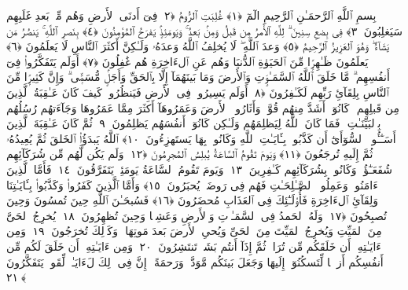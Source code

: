 
  
    
  
    
    

\nopagebreak
  بِسمِ ٱللَّهِ ٱلرَّحمَـٰنِ ٱلرَّحِيمِ
  الٓمٓ ﴿١﴾
 غُلِبَتِ ٱلرُّومُ ﴿٢﴾
 فِىٓ أَدنَى ٱلأَرضِ وَهُم مِّنۢ بَعدِ غَلَبِهِم سَيَغلِبُونَ ﴿٣﴾
 فِى بِضعِ سِنِينَ ۗ لِلَّهِ ٱلأَمرُ مِن قَبلُ وَمِنۢ بَعدُ ۚ وَيَومَئِذٍۢ يَفرَحُ ٱلمُؤمِنُونَ ﴿٤﴾
 بِنَصرِ ٱللَّهِ ۚ يَنصُرُ مَن يَشَآءُ ۖ وَهُوَ ٱلعَزِيزُ ٱلرَّحِيمُ ﴿٥﴾
 وَعدَ ٱللَّهِ ۖ لَا يُخلِفُ ٱللَّهُ وَعدَهُۥ وَلَـٰكِنَّ أَكثَرَ ٱلنَّاسِ لَا يَعلَمُونَ ﴿٦﴾
 يَعلَمُونَ ظَـٰهِرًۭا مِّنَ ٱلحَيَوٰةِ ٱلدُّنيَا وَهُم عَنِ ٱلءَاخِرَةِ هُم غَٰفِلُونَ ﴿٧﴾
 أَوَلَم يَتَفَكَّرُوا۟ فِىٓ أَنفُسِهِم ۗ مَّا خَلَقَ ٱللَّهُ ٱلسَّمَـٰوَٟتِ وَٱلأَرضَ وَمَا بَينَهُمَآ إِلَّا بِٱلحَقِّ وَأَجَلٍۢ مُّسَمًّۭى ۗ وَإِنَّ كَثِيرًۭا مِّنَ ٱلنَّاسِ بِلِقَآئِ رَبِّهِم لَكَـٰفِرُونَ ﴿٨﴾
 أَوَلَم يَسِيرُوا۟ فِى ٱلأَرضِ فَيَنظُرُوا۟ كَيفَ كَانَ عَـٰقِبَةُ ٱلَّذِينَ مِن قَبلِهِم ۚ كَانُوٓا۟ أَشَدَّ مِنهُم قُوَّةًۭ وَأَثَارُوا۟ ٱلأَرضَ وَعَمَرُوهَآ أَكثَرَ مِمَّا عَمَرُوهَا وَجَآءَتهُم رُسُلُهُم بِٱلبَيِّنَـٰتِ ۖ فَمَا كَانَ ٱللَّهُ لِيَظلِمَهُم وَلَـٰكِن كَانُوٓا۟ أَنفُسَهُم يَظلِمُونَ ﴿٩﴾
 ثُمَّ كَانَ عَـٰقِبَةَ ٱلَّذِينَ أَسَـٰٓـُٔوا۟ ٱلسُّوٓأَىٰٓ أَن كَذَّبُوا۟ بِـَٔايَـٰتِ ٱللَّهِ وَكَانُوا۟ بِهَا يَستَهزِءُونَ ﴿١٠﴾
 ٱللَّهُ يَبدَؤُا۟ ٱلخَلقَ ثُمَّ يُعِيدُهُۥ ثُمَّ إِلَيهِ تُرجَعُونَ ﴿١١﴾
 وَيَومَ تَقُومُ ٱلسَّاعَةُ يُبلِسُ ٱلمُجرِمُونَ ﴿١٢﴾
 وَلَم يَكُن لَّهُم مِّن شُرَكَآئِهِم شُفَعَـٰٓؤُا۟ وَكَانُوا۟ بِشُرَكَآئِهِم كَـٰفِرِينَ ﴿١٣﴾
 وَيَومَ تَقُومُ ٱلسَّاعَةُ يَومَئِذٍۢ يَتَفَرَّقُونَ ﴿١٤﴾
 فَأَمَّا ٱلَّذِينَ ءَامَنُوا۟ وَعَمِلُوا۟ ٱلصَّـٰلِحَـٰتِ فَهُم فِى رَوضَةٍۢ يُحبَرُونَ ﴿١٥﴾
 وَأَمَّا ٱلَّذِينَ كَفَرُوا۟ وَكَذَّبُوا۟ بِـَٔايَـٰتِنَا وَلِقَآئِ ٱلءَاخِرَةِ فَأُو۟لَـٰٓئِكَ فِى ٱلعَذَابِ مُحضَرُونَ ﴿١٦﴾
 فَسُبحَـٰنَ ٱللَّهِ حِينَ تُمسُونَ وَحِينَ تُصبِحُونَ ﴿١٧﴾
 وَلَهُ ٱلحَمدُ فِى ٱلسَّمَـٰوَٟتِ وَٱلأَرضِ وَعَشِيًّۭا وَحِينَ تُظهِرُونَ ﴿١٨﴾
 يُخرِجُ ٱلحَىَّ مِنَ ٱلمَيِّتِ وَيُخرِجُ ٱلمَيِّتَ مِنَ ٱلحَىِّ وَيُحىِ ٱلأَرضَ بَعدَ مَوتِهَا ۚ وَكَذَٟلِكَ تُخرَجُونَ ﴿١٩﴾
 وَمِن ءَايَـٰتِهِۦٓ أَن خَلَقَكُم مِّن تُرَابٍۢ ثُمَّ إِذَآ أَنتُم بَشَرٌۭ تَنتَشِرُونَ ﴿٢٠﴾
 وَمِن ءَايَـٰتِهِۦٓ أَن خَلَقَ لَكُم مِّن أَنفُسِكُم أَزوَٟجًۭا لِّتَسكُنُوٓا۟ إِلَيهَا وَجَعَلَ بَينَكُم مَّوَدَّةًۭ وَرَحمَةً ۚ إِنَّ فِى ذَٟلِكَ لَءَايَـٰتٍۢ لِّقَومٍۢ يَتَفَكَّرُونَ ﴿٢١﴾
